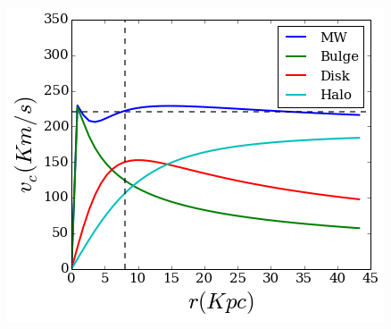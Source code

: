 \begin{figure}[H]\label{MWLM10}
\centering
\includegraphics[scale=0.7]{../figures/MWLM10.png}
\end{figure}


